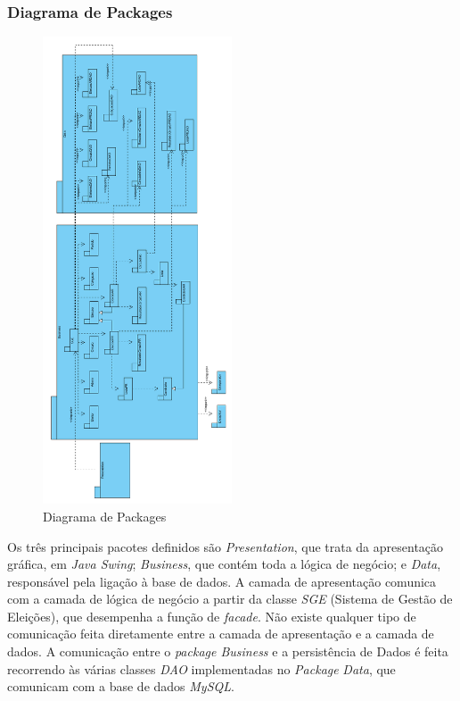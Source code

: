\documentclass[a4paper,12pt]{report}
\begin{document}
\subsubsection{Diagrama de Packages}

\begin{figure}[H]
\begin{center}
	\includegraphics[width=0.5\textwidth]{media/dig_package.png}
	 \caption{Diagrama de Packages}
\end{center}
\end{figure}

Os três principais pacotes definidos são \emph{Presentation}, que trata da apresentação gráfica, em \emph{Java Swing}; \emph{Business}, que contém toda a lógica de negócio; e \emph{Data}, responsável pela ligação à base de dados. A camada de apresentação comunica com a camada de lógica de negócio a partir da classe \emph{SGE} (Sistema de Gestão de Eleições), que desempenha a função de \emph{facade}. Não existe qualquer tipo de comunicação feita diretamente entre a camada de apresentação e a camada de dados.
 A comunicação entre o \emph{package Business} e a persistência de Dados é feita recorrendo às várias classes \emph{DAO} implementadas no \emph{Package} \emph{Data}, que comunicam com a base de dados \emph{MySQL}.
 
\end{document}
